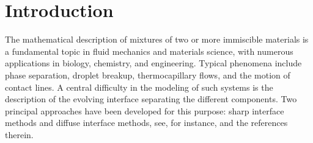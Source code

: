 \documentclass[11pt,reqno]{amsart}
\theoremstyle{remark}
\numberwithin{equation}{section}
\begin{document}
\begin{abstract}
We study a thermodynamically consistent bulk-surface Navier--Stokes--Cahn--Hilliard system describing two-phase flows exhibiting moving contact lines, variable contact angles, and mass transfer. We establish the existence of global weak solutions for non-degenerate mobility functions and singular free-energy potentials. The proof is based on an implicit time-discretization scheme and a subdifferential characterization of the convex part of the bulk-surface free energy. Finally, we study the simultaneous high-friction and decoupling limit, and prove that corresponding weak solutions converge, up to a subsequence, to a weak solution of the Abels--Garcke--Grün model. One key ingredient of the proof is the Mosco convergence of the convex part of the bulk-surface free energy, which might be of independent interest.
\end{abstract}

\maketitle

\section{Introduction}
\label{SECT:INTRO}
\noindent
The mathematical description of mixtures of two or more immiscible materials is a fundamental topic in fluid mechanics and materials science, with numerous applications in biology, chemistry, and engineering. Typical phenomena include phase separation, droplet breakup, thermocapillary flows, and the motion of contact lines. A central difficulty in the modeling of such systems is the description of the evolving interface separating the different components. Two principal approaches have been developed for this purpose: sharp interface methods and diffuse interface methods, see, for instance, \cite{Abels2018,Du2020,Giga2018,Pruess2016} and the references therein.
\end{document}
